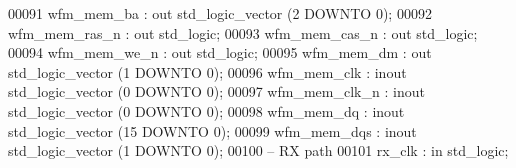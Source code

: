 \begin{DoxyCode}
00091       \textcolor{vhdlchar}{wfm_mem_ba}              \textcolor{vhdlchar}{:} \textcolor{keywordflow}{out}    \textcolor{comment}{std\_logic\_vector} \textcolor{vhdlchar}{(}\textcolor{vhdllogic}{}\textcolor{vhdllogic}{2} \textcolor{keywordflow}{DOWNTO} \textcolor{vhdllogic}{}\textcolor{vhdllogic}{0}\textcolor{vhdlchar}{)};
00092       \textcolor{vhdlchar}{wfm_mem_ras_n}           \textcolor{vhdlchar}{:} \textcolor{keywordflow}{out}    \textcolor{comment}{std\_logic};
00093       \textcolor{vhdlchar}{wfm_mem_cas_n}           \textcolor{vhdlchar}{:} \textcolor{keywordflow}{out}    \textcolor{comment}{std\_logic};
00094       \textcolor{vhdlchar}{wfm_mem_we_n}            \textcolor{vhdlchar}{:} \textcolor{keywordflow}{out}    \textcolor{comment}{std\_logic};
00095       \textcolor{vhdlchar}{wfm_mem_dm}              \textcolor{vhdlchar}{:} \textcolor{keywordflow}{out}    \textcolor{comment}{std\_logic\_vector} \textcolor{vhdlchar}{(}\textcolor{vhdllogic}{}\textcolor{vhdllogic}{1} \textcolor{keywordflow}{DOWNTO} \textcolor{vhdllogic}{}\textcolor{vhdllogic}{0}\textcolor{vhdlchar}{)};
00096       \textcolor{vhdlchar}{wfm_mem_clk}             \textcolor{vhdlchar}{:} \textcolor{keywordflow}{inout}  \textcolor{comment}{std\_logic\_vector} \textcolor{vhdlchar}{(}\textcolor{vhdllogic}{}\textcolor{vhdllogic}{0} \textcolor{keywordflow}{DOWNTO} \textcolor{vhdllogic}{}\textcolor{vhdllogic}{0}\textcolor{vhdlchar}{)};
00097       \textcolor{vhdlchar}{wfm_mem_clk_n}           \textcolor{vhdlchar}{:} \textcolor{keywordflow}{inout}  \textcolor{comment}{std\_logic\_vector} \textcolor{vhdlchar}{(}\textcolor{vhdllogic}{}\textcolor{vhdllogic}{0} \textcolor{keywordflow}{DOWNTO} \textcolor{vhdllogic}{}\textcolor{vhdllogic}{0}\textcolor{vhdlchar}{)};
00098       \textcolor{vhdlchar}{wfm_mem_dq}              \textcolor{vhdlchar}{:} \textcolor{keywordflow}{inout}  \textcolor{comment}{std\_logic\_vector} \textcolor{vhdlchar}{(}\textcolor{vhdllogic}{}\textcolor{vhdllogic}{15} \textcolor{keywordflow}{DOWNTO} \textcolor{vhdllogic}{}\textcolor{vhdllogic}{0}\textcolor{vhdlchar}{)};
00099       \textcolor{vhdlchar}{wfm_mem_dqs}             \textcolor{vhdlchar}{:} \textcolor{keywordflow}{inout}  \textcolor{comment}{std\_logic\_vector} \textcolor{vhdlchar}{(}\textcolor{vhdllogic}{}\textcolor{vhdllogic}{1} \textcolor{keywordflow}{DOWNTO} \textcolor{vhdllogic}{}\textcolor{vhdllogic}{0}\textcolor{vhdlchar}{)};   
00100 \textcolor{keyword}{      -- RX path}
00101       \textcolor{vhdlchar}{rx_clk}                  \textcolor{vhdlchar}{:} \textcolor{keywordflow}{in}     \textcolor{comment}{std\_logic};

\end{DoxyCode}

